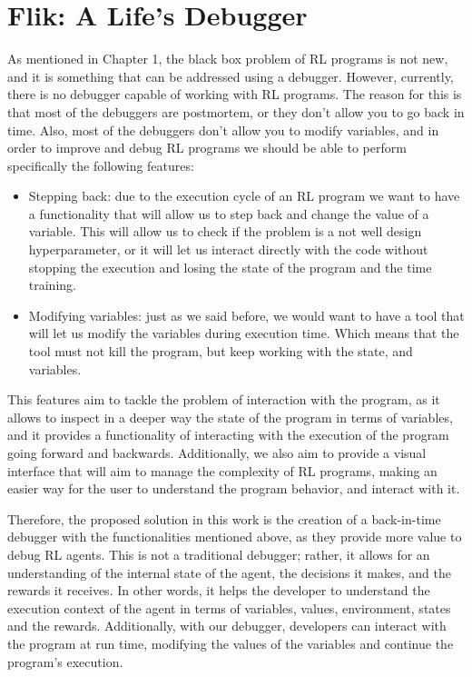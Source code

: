
\section{Flik: A Life's Debugger}
\label{sec:solution}

As mentioned in Chapter 1, the black box problem of \ac{RL} programs is 
not new, and it is something 
that can be addressed using a debugger. However, currently, there is no 
debugger capable of working with RL programs. The reason for this is that 
most of the debuggers are postmortem, or they don't allow you to go back in 
time. Also, most of the debuggers don't allow you to modify variables, and in 
order to improve and debug \ac{RL} programs we should be able to perform 
specifically the following features:

\begin{itemize}
    \item Stepping back: due to the execution cycle of an \ac{RL} program we 
    want to have a functionality that will allow us to step back and change 
    the value of a variable. This will allow us to check if the problem is a 
    not well design hyperparameter, or it will let us interact directly with 
    the code without stopping the execution and losing the state of the program 
    and the time training. 
    \item Modifying variables: just as we said before, we would want to have a 
    tool that will let us modify the variables during execution time. Which means
    that the tool must not kill the program, but keep working with the state, 
    and variables.
\end{itemize}

This features aim to tackle the problem of interaction with the program, as it allows 
to inspect in a deeper way the state of the program in terms of variables, and it provides
a functionality of interacting with the execution of the program going forward and backwards.
Additionally, we also aim to provide a visual interface that will aim to manage the 
complexity of \ac{RL} programs, making an easier way for the user to understand 
the program behavior, and interact with it.

Therefore, the proposed solution in this work is the creation of a back-in-time debugger with the 
functionalities mentioned above, as they provide more value to debug \ac{RL} agents. This 
is not a traditional debugger; rather, it allows for an understanding of the 
internal state of the agent, the decisions it makes, and the rewards it 
receives. In other words, it helps the developer to understand the execution context of the
agent in terms of variables, values, environment, states and the rewards. Additionally, with 
our debugger, developers can interact with the program at run time, modifying the values 
of the variables and continue the program's execution.

